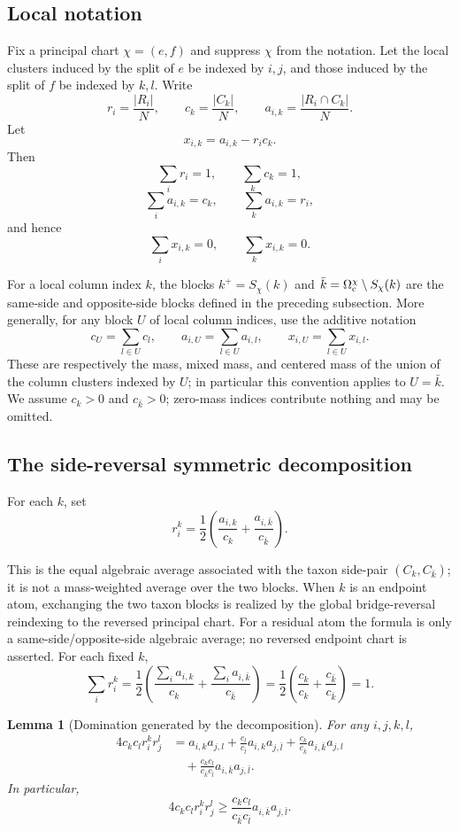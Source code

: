 \documentclass[11pt]{article}
\newtheorem{lemma}[theorem]{Lemma}
\begin{document}
\subsection{Local notation}

Fix a principal chart $\chi=(e,f)$ and suppress $\chi$ from the notation.
Let the local clusters induced by the split of $e$ be indexed by $i,j$, and
those induced by the split of $f$ be indexed by $k,l$.  Write
\[
r_i=\frac{|R_i|}{N},
\qquad
c_k=\frac{|C_k|}{N},
\qquad
a_{i,k}=\frac{|R_i\cap C_k|}{N}.
\]
Let
\[
x_{i,k}=a_{i,k}-r_ic_k.
\]
Then
\[
\sum_i r_i=1,\qquad \sum_k c_k=1,
\]
\[
\sum_i a_{i,k}=c_k,\qquad \sum_k a_{i,k}=r_i,
\]
and hence
\[
\sum_i x_{i,k}=0,
\qquad
\sum_k x_{i,k}=0.
\]

For a local column index $k$, the blocks $k^+=S_\chi(k)$ and
$\bar k=\Omega_{\rm c}^\chi\setminus S_\chi(k)$ are the same-side and
opposite-side blocks defined in the preceding subsection.  More generally,
for any block $U$ of local column indices, use the additive notation
\[
c_U=\sum_{l\in U}c_l,
\qquad
a_{i,U}=\sum_{l\in U}a_{i,l},
\qquad
x_{i,U}=\sum_{l\in U}x_{i,l}.
\]
These are respectively the mass, mixed mass, and centered mass of the union of
the column clusters indexed by $U$; in particular this convention applies to
$U=\bar k$.
We assume $c_k>0$ and $c_{\bar k}>0$; zero-mass indices contribute nothing and may be omitted.

\subsection{The side-reversal symmetric decomposition}

For each $k$, set
\[
r_i^k=\frac12\left(\frac{a_{i,k}}{c_k}+\frac{a_{i,\bar k}}{c_{\bar k}}\right).
\]

This is the equal algebraic average associated with the taxon side-pair
$(C_k,C_{\bar k})$; it is not a mass-weighted average over the two blocks.
When $k$ is an endpoint atom, exchanging the two taxon blocks is realized by
the global bridge-reversal reindexing to the reversed principal chart.  For a
residual atom the formula is only a same-side/opposite-side algebraic average;
no reversed endpoint chart is asserted.  For each fixed $k$,
\[
\sum_i r_i^k
=
\frac12\left(
\frac{\sum_i a_{i,k}}{c_k}
+
\frac{\sum_i a_{i,\bar k}}{c_{\bar k}}
\right)
=
\frac12\left(\frac{c_k}{c_k}+\frac{c_{\bar k}}{c_{\bar k}}\right)=1.
\]

\begin{lemma}[Domination generated by the decomposition]\label{lem:domination-basic}
For any $i,j,k,l$,
\[
\begin{aligned}
4c_kc_l r_i^k r_j^l
&=
a_{i,k}a_{j,l}
+
\frac{c_l}{c_{\bar l}}a_{i,k}a_{j,\bar l}
+
\frac{c_k}{c_{\bar k}}a_{i,\bar k}a_{j,l}\\
&\quad+
\frac{c_kc_l}{c_{\bar k}c_{\bar l}}a_{i,\bar k}a_{j,\bar l}.
\end{aligned}
\]
In particular,
\[
4c_kc_l r_i^k r_j^l
\ge
\frac{c_kc_l}{c_{\bar k}c_{\bar l}}a_{i,\bar k}a_{j,\bar l}.
\]
\end{lemma}
\end{document}
